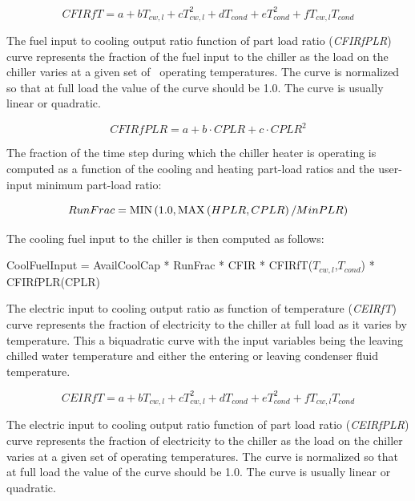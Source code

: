 \begin{equation}
CFIRfT = a + b{T_{cw,l}} + cT_{cw,l}^2 + d{T_{cond}} + eT_{cond}^2 + f{T_{cw,l}}{T_{cond}}
\end{equation}

The fuel input to cooling output ratio function of part load ratio (\emph{CFIRfPLR}) curve represents the fraction of the fuel input to the chiller as the load on the chiller varies at a given set of~ operating temperatures. The curve is normalized so that at full load the value of the curve should be 1.0. The curve is usually linear or quadratic.

\begin{equation}
CFIRfPLR = a + b \cdot CPLR + c \cdot CPL{R^2}
\end{equation}

The fraction of the time step during which the chiller heater is operating is computed as a function of the cooling and heating part-load ratios and the user-input minimum part-load ratio:

\begin{equation}
RunFrac = {\mathop{\rm MIN}\nolimits} \left( {1.0,{\mathop{\rm MAX}\nolimits} \left( {HPLR,CPLR} \right)/MinPLR} \right)
\end{equation}

The cooling fuel input to the chiller is then computed as follows:

CoolFuelInput = AvailCoolCap * RunFrac * CFIR * CFIRfT($T_{cw,l}$,$T_{cond}$) * CFIRfPLR(CPLR)

The electric input to cooling output ratio as function of temperature (\emph{CEIRfT}) curve represents the fraction of electricity to the chiller at full load as it varies by temperature. This a biquadratic curve with the input variables being the leaving chilled water temperature and either the entering or leaving condenser fluid temperature.

\begin{equation}
CEIRfT = a + b{T_{cw,l}} + cT_{cw,l}^2 + d{T_{cond}} + eT_{cond}^2 + f{T_{cw,l}}{T_{cond}}
\end{equation}

The electric input to cooling output ratio function of part load ratio (\emph{CEIRfPLR}) curve represents the fraction of electricity to the chiller as the load on the chiller varies at a given set of operating temperatures. The curve is normalized so that at full load the value of the curve should be 1.0. The curve is usually linear or quadratic.

